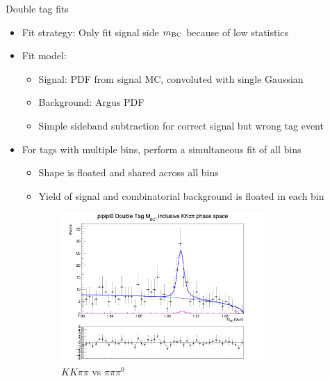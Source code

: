 \documentclass{beamer}
\begin{document}
\begin{frame}{Double tag fits}
  \begin{itemize}
    \item{Fit strategy: Only fit signal side $m_{\rm BC}$ because of low statistics}
    \item{Fit model:}
    \begin{itemize}
      \item{Signal: PDF from signal MC, convoluted with single Gaussian}
      \item{Background: Argus PDF}
      \item{Simple sideband subtraction for correct signal but wrong tag event}
    \end{itemize}
    \item{For tags with multiple bins, perform a simultaneous fit of all bins}
    \begin{itemize}
      \item{Shape is floated and shared across all bins}
      \item{Yield of signal and combinatorial background is floated in each bin}
    \end{itemize}
  \end{itemize}
  \begin{figure}
    \centering
    \begin{subfigure}{0.5\textwidth}
      \centering
      \includegraphics[width=0.85\textwidth]{Plots/DoubleTagYield_DoubleTag_CP_KKpipi_vs_pipipi0_SignalBin0.png}
      \caption{$KK\pi\pi$ vs $\pi\pi\pi^0$}
    \end{subfigure}%
    \begin{subfigure}{0.5\textwidth}
      \centering

\end{subfigure}
\end{figure}
\end{frame}
\end{document}
